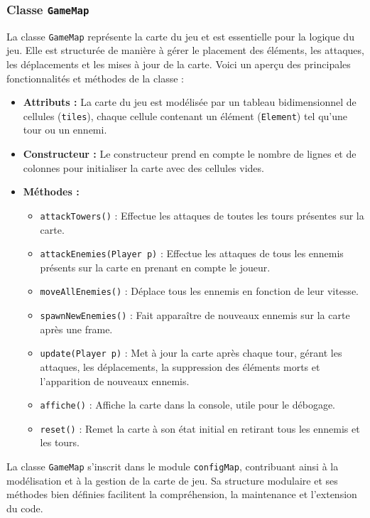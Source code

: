 \documentclass{article}
\begin{document}
\subsubsection{Classe \texttt{GameMap}}
La classe \texttt{GameMap} représente la carte du jeu et est essentielle pour la logique du jeu. Elle est structurée de manière à gérer le placement des éléments, les attaques, les déplacements et les mises à jour de la carte. Voici un aperçu des principales fonctionnalités et méthodes de la classe :

\begin{itemize}
    \item \textbf{Attributs :} La carte du jeu est modélisée par un tableau bidimensionnel de cellules (\texttt{tiles}), chaque cellule contenant un élément (\texttt{Element}) tel qu'une tour ou un ennemi.

    \item \textbf{Constructeur :} Le constructeur prend en compte le nombre de lignes et de colonnes pour initialiser la carte avec des cellules vides.

    \item \textbf{Méthodes :}
    \begin{itemize}
        \item \texttt{attackTowers()} : Effectue les attaques de toutes les tours présentes sur la carte.
        \item \texttt{attackEnemies(Player p)} : Effectue les attaques de tous les ennemis présents sur la carte en prenant en compte le joueur.
        \item \texttt{moveAllEnemies()} : Déplace tous les ennemis en fonction de leur vitesse.
        \item \texttt{spawnNewEnemies()} : Fait apparaître de nouveaux ennemis sur la carte après une frame.
        \item \texttt{update(Player p)} : Met à jour la carte après chaque tour, gérant les attaques, les déplacements, la suppression des éléments morts et l'apparition de nouveaux ennemis.
        \item \texttt{affiche()} : Affiche la carte dans la console, utile pour le débogage.
        \item \texttt{reset()} : Remet la carte à son état initial en retirant tous les ennemis et les tours.
    \end{itemize}
\end{itemize}

La classe \texttt{GameMap} s'inscrit dans le module \texttt{configMap}, contribuant ainsi à la modélisation et à la gestion de la carte de jeu. Sa structure modulaire et ses méthodes bien définies facilitent la compréhension, la maintenance et l'extension du code.
\end{document}
